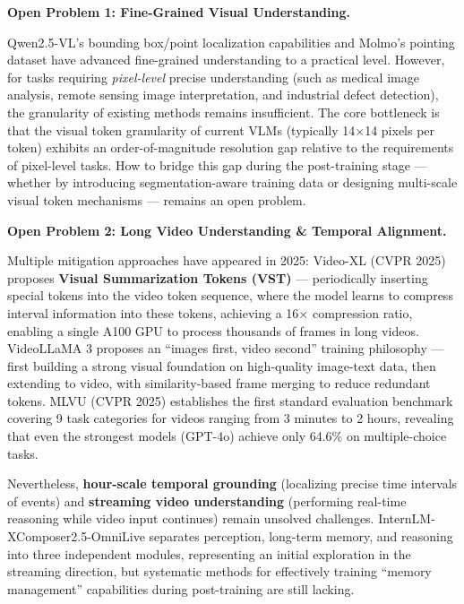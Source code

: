 \begin{openproblembox}
\textbf{Open Problem 1: Fine-Grained Visual Understanding.}

Qwen2.5-VL's bounding box/point localization capabilities and Molmo's pointing dataset
have advanced fine-grained understanding to a practical level.
However, for tasks requiring \textit{pixel-level} precise understanding (such as medical image analysis, remote sensing image interpretation,
and industrial defect detection), the granularity of existing methods remains insufficient.
The core bottleneck is that
the visual token granularity of current VLMs (typically 14$\times$14 pixels per token)
exhibits an order-of-magnitude resolution gap relative to the requirements of pixel-level tasks.
How to bridge this gap during the post-training stage ---
whether by introducing segmentation-aware training data or designing multi-scale visual token mechanisms ---
remains an open problem.
\end{openproblembox}

\begin{openproblembox}
\textbf{Open Problem 2: Long Video Understanding \& Temporal Alignment.}

Multiple mitigation approaches have appeared in 2025:
Video-XL \cite{shu2024videoxl} (CVPR 2025) proposes \textbf{Visual Summarization Tokens (VST)} ---
periodically inserting special tokens into the video token sequence,
where the model learns to compress interval information into these tokens, achieving a 16$\times$ compression ratio,
enabling a single A100 GPU to process thousands of frames in long videos.
VideoLLaMA 3 \cite{zhang2025videollama3} proposes an ``images first, video second'' training philosophy ---
first building a strong visual foundation on high-quality image-text data, then extending to video,
with similarity-based frame merging to reduce redundant tokens.
MLVU \cite{zhou2024mlvu} (CVPR 2025) establishes the first standard evaluation benchmark
covering 9 task categories for videos ranging from 3 minutes to 2 hours,
revealing that even the strongest models (GPT-4o) achieve only 64.6\% on multiple-choice tasks.

Nevertheless, \textbf{hour-scale temporal grounding} (localizing precise time intervals of events)
and \textbf{streaming video understanding} (performing real-time reasoning while video input continues)
remain unsolved challenges.
InternLM-XComposer2.5-OmniLive \cite{chen2024omnilive}
separates perception, long-term memory, and reasoning into three independent modules,
representing an initial exploration in the streaming direction,
but systematic methods for effectively training ``memory management'' capabilities during post-training are still lacking.
\end{openproblembox}

